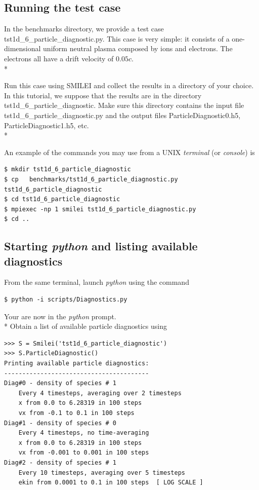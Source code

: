 \documentclass[11pt]{article}
\newcommand{\code}[1]{\colorbox{yellow!15}{\ttfamily #1}}
\begin{document}
\subsection{Running the test case}

In the \code{benchmarks} directory, we provide a test case \code{tst1d\_6\_particle\_diagnostic.py}. This case is very simple: it consists of a one-dimensional uniform neutral plasma composed by ions and electrons. The electrons all have a drift velocity of $0.05c$.\\*

Run this case using SMILEI and collect the results in a directory of your choice. In this tutorial, we suppose that the results are in the directory \code{tst1d\_6\_particle\_diagnostic}. Make sure this directory contains the input file \code{tst1d\_6\_particle\_diagnostic.py} and the output files \code{ParticleDiagnostic0.h5}, \code{ParticleDiagnostic1.h5}, etc.\\*

An example of the commands you may use from a UNIX \textit{terminal} (or \textit{console}) is
\begin{lstlisting}
$ mkdir tst1d_6_particle_diagnostic
$ cp   benchmarks/tst1d_6_particle_diagnostic.py    tst1d_6_particle_diagnostic
$ cd tst1d_6_particle_diagnostic
$ mpiexec -np 1 smilei tst1d_6_particle_diagnostic.py
$ cd ..
\end{lstlisting}

\subsection{Starting \textit{python} and listing available diagnostics}

From the same terminal, launch \textit{python} using the command
\begin{lstlisting}
$ python -i scripts/Diagnostics.py
\end{lstlisting}

Your are now in the \textit{python} prompt.\\*
Obtain a list of available particle diagnostics using
\begin{lstlisting}
>>> S = Smilei('tst1d_6_particle_diagnostic')
>>> S.ParticleDiagnostic()
Printing available particle diagnostics:
----------------------------------------
Diag#0 - density of species # 1 
    Every 4 timesteps, averaging over 2 timesteps
    x from 0.0 to 6.28319 in 100 steps 
    vx from -0.1 to 0.1 in 100 steps 
Diag#1 - density of species # 0 
    Every 4 timesteps, no time-averaging
    x from 0.0 to 6.28319 in 100 steps 
    vx from -0.001 to 0.001 in 100 steps 
Diag#2 - density of species # 1 
    Every 10 timesteps, averaging over 5 timesteps
    ekin from 0.0001 to 0.1 in 100 steps  [ LOG SCALE ] 
\end{lstlisting}
\end{document}

